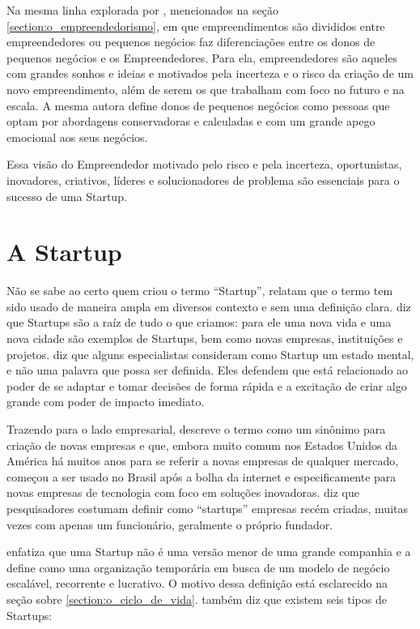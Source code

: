 Na mesma linha explorada por , mencionados na seção \ref{section:o_empreendedorismo}, em que empreendimentos são divididos entre empreendedores ou pequenos negócios  faz diferenciações entre os donos de pequenos negócios e os Empreendedores. Para ela, empreendedores são aqueles com grandes sonhos e ideias e motivados pela incerteza e o risco da criação de um novo empreendimento, além de serem os que trabalham com foco no futuro e na escala. A mesma autora define donos de pequenos negócios como pessoas que optam por abordagens conservadoras e calculadas e com um grande apego emocional aos seus negócios.

Essa visão do Empreendedor motivado pelo risco e pela incerteza, oportunistas, inovadores, criativos, líderes e solucionadores de problema são essenciais para o sucesso de uma Startup.

\section{A Startup}
\label{section:as_startups}

Não se sabe ao certo quem criou o termo ``Startup'',  relatam que o termo tem sido usado de maneira ampla em diversos contexto e sem uma definição clara.  diz que Startups são a raíz de tudo o que criamos: para ele uma nova vida e uma nova cidade são exemplos de Startups, bem como novas empresas, instituições e projetos.  diz que alguns especialistas consideram como Startup um estado mental, e não uma palavra que possa ser definida. Eles defendem que está relacionado ao poder de se adaptar e tomar decisões de forma rápida e a excitação de criar algo grande com poder de impacto imediato.

Trazendo para o lado empresarial,  descreve o termo como um sinônimo para criação de novas empresas e que, embora muito comum nos Estados Unidos da América há muitos anos para se referir a novas empresas de qualquer mercado, começou a ser usado no Brasil após a bolha da internet e especificamente para novas empresas de tecnologia com foco em soluções inovadoras.  diz que pesquisadores costumam definir como ``startups'' empresas recém criadas, muitas vezes com apenas um funcionário, geralmente o próprio fundador.

 enfatiza que uma Startup não é uma versão menor de uma grande companhia e a define como uma organização temporária em busca de um modelo de negócio escalável, recorrente e lucrativo. O motivo dessa definição está esclarecido na seção sobre \ref{section:o_ciclo_de_vida}.  também  diz que existem seis tipos de Startups: 

